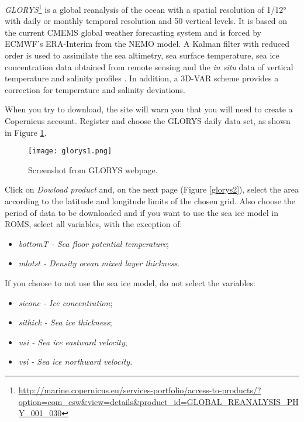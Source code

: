 \noindent \textcolor{bleu_cite}{\textit{GLORYS}\footnote{\textcolor{bleu_cite}{\href{http://marine.copernicus.eu/services-portfolio/access-to-products/?option=com\_csw\&view=details\&product\_id=GLOBAL\_REANALYSIS\_PHY\_001\_030}{http://marine.copernicus.eu/services-portfolio/access-to-products/?option=com\_csw\&view=details\&product\_id=GLOBAL\_REANALYSIS\_PHY\_001\_030}}}}
is a global reanalysis of the ocean with a spatial resolution of 1/12° with daily or monthly temporal resolution and 
50 vertical levels. It is based on the current CMEMS global weather forecasting system and is forced by ECMWF's ERA-Interim from the NEMO model.
A Kalman filter with reduced order is used to assimilate the sea altimetry, sea surface temperature, sea ice concentration data obtained 
from remote sensing and the \textit{in situ} data of vertical temperature and salinity profiles .
In addition, a 3D-VAR scheme provides a correction for temperature and salinity deviations.
\bigskip

\noindent When you try to download, the site will warn you that you will need to create a Copernicus account.
Register and choose the GLORYS daily data set, as shown in Figure \textcolor{bleu_cite}{\ref{glorys1}}.
\bigskip

\begin{figure}[H]
    \centering
    \texttt{[image: glorys1.png]}
    \caption{Screenshot from GLORYS webpage.}
    \label{glorys1}
\end{figure}
\bigskip

\noindent Click on \textit{Dowload product} and, on the next page (Figure \textcolor{bleu_cite}{\ref{glorys2}}), select the area according to 
the latitude and longitude limits of the chosen grid. Also choose the period of data to be downloaded and if you want to use the sea 
ice model in ROMS, select all variables, with the exception of:
\bigskip

\begin{itemize}
    \item \textit{ bottomT - Sea floor potential temperature};
    \item \textit{mlotst - Density ocean mixed layer thickness}.
\end{itemize}
\bigskip

\noindent If you choose to not use the sea ice model, do not select the variables:
\bigskip

\begin{itemize}
    \item \textit{siconc - Ice concentration};
    \item \textit{sithick - Sea ice thickness};
    \item \textit{usi - Sea ice eastward velocity};
    \item \textit{vsi - Sea ice northward velocity}.
\end{itemize}
\bigskip

